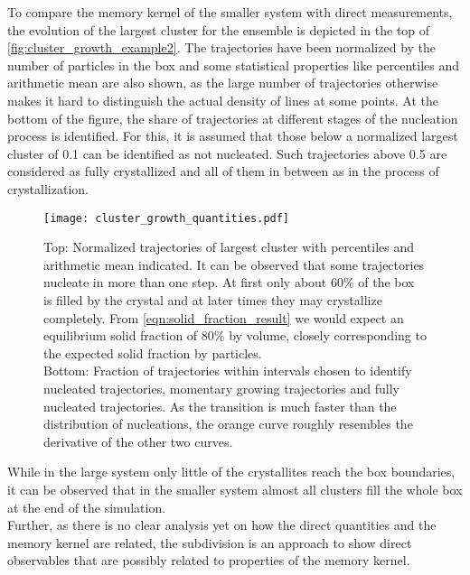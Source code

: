 To compare the memory kernel of the smaller system with direct measurements, the evolution of the largest cluster for the ensemble is depicted in the top of \autoref{fig:cluster_growth_example2}. The trajectories have been normalized by the number of particles in the box and some statistical properties like percentiles and arithmetic mean are also shown, as the large number of trajectories otherwise makes it hard to distinguish the actual density of lines at some points. At the bottom of the figure, the share of trajectories at different stages of the nucleation process is identified. For this, it is assumed that those below a normalized largest cluster of 0.1 can be identified as not nucleated. Such trajectories above 0.5 are considered as fully crystallized and all of them in between as in the process of crystallization.\\
\begin{figure}[h]
\centering
\texttt{[image: cluster\_growth\_quantities.pdf]}
\caption[Largest cluster trajectories of small system with percentiles and average]{Top: Normalized trajectories of largest cluster with percentiles and arithmetic mean indicated. It can be observed that some trajectories nucleate in more than one step. At first only about 60\% of the box is filled by the crystal and at later times they may crystallize completely. From \autoref{eqn:solid_fraction_result} we would expect an equilibrium solid fraction of 80\% by volume, closely corresponding to the expected solid fraction by particles.\\
Bottom: Fraction of trajectories within intervals chosen to identify nucleated trajectories, momentary growing trajectories and fully nucleated trajectories. As the transition is much faster than the distribution of nucleations, the orange curve roughly resembles the derivative of the other two curves.}
\label{fig:cluster_growth_example2}
\end{figure}
While in the large system only little of the crystallites reach the box boundaries, it can be observed that in the smaller system almost all clusters fill the whole box at the end of the simulation.\\
Further, as there is no clear analysis yet on how the direct quantities and the memory kernel are related, the subdivision is an approach to show direct observables that are possibly related to properties of the memory kernel.\\

